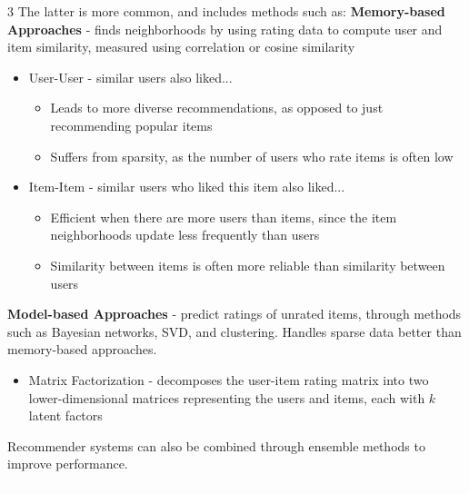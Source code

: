 \documentclass[10pt,landscape,letterpaper]{article}
\begin{document}
\begin{multicols}{3}
The latter is more common, and includes methods such as:
\textbf{Memory-based Approaches} - finds neighborhoods by using rating data to compute user and item similarity, measured using correlation or cosine similarity

\begin{itemize}[label={--},leftmargin=4mm]
\itemsep -.4mm
\item User-User - similar users also liked...
\begin{itemize}[label={--},leftmargin=4mm]
    \vspace{-1mm}
    \itemsep -.4mm
    \item Leads to more diverse recommendations, as opposed to just recommending popular items
    \item Suffers from sparsity, as the number of users who rate items is often low
    \end{itemize}
    \vspace{-1mm}
\item Item-Item - similar users who liked this item also liked...
    \begin{itemize}[label={--},leftmargin=4mm]
    \itemsep -.4mm
    \vspace{-1.5mm}
    \item Efficient when there are more users than items, since the item neighborhoods update less frequently than users
    \item Similarity between items is often more reliable than similarity between users
    \end{itemize}
\end{itemize}
\vspace{-1.5mm}
\smallskip
\textbf{Model-based Approaches} - predict ratings of unrated items, through methods such as Bayesian networks, SVD, and clustering. Handles sparse data better than memory-based approaches.\\
\begin{itemize}[label={--},leftmargin=4mm]
\itemsep -.4mm
\vspace{-.5mm}
\item Matrix Factorization - decomposes the user-item rating matrix into two lower-dimensional matrices representing the users and items, each with $k$ latent factors
\end{itemize}
\smallskip
\vspace{-1mm}
Recommender systems can also be combined through ensemble methods to improve performance.
\columnbreak
\\\textcolor{white}{.}\vspace{-3mm}\\ %

\end{multicols}
\end{document}
